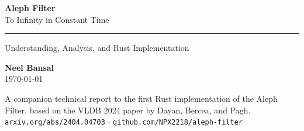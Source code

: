 \documentclass[11pt, a4paper]{report}
\theoremstyle{definition}
\begin{document}
\begin{titlepage}
  \centering
  \vspace*{3cm}
  
  {\fontsize{36}{40}\selectfont\bfseries Aleph Filter}\\[0.6cm]
  {\Large\color{DarkGray} To Infinity in Constant Time}
  
  \vspace{0.8cm}
  \rule{0.4\textwidth}{0.8pt}
  \vspace{0.8cm}
  
  {\large Understanding, Analysis, and Rust Implementation}
  
  \vspace{2.5cm}
  
  {\Large\bfseries Neel Bansal}\\[0.4cm]
  {\color{black} \today}
  
  \vfill
  
  \begin{tcolorbox}[
    colback=white,
    colframe=black!30,
    width=0.8\textwidth,
    arc=2pt,
    boxrule=0.4pt,
    top=10pt, bottom=10pt,
  ]
    \centering\small\color{DarkGray}
    A companion technical report to the first Rust implementation of the 
    Aleph Filter, based on the VLDB 2024 paper by Dayan, Bercea, and 
    Pagh.\\[6pt]
    \texttt{arxiv.org/abs/2404.04703}
    \quad$\cdot$\quad
    \texttt{github.com/NPX2218/aleph-filter}
  \end{tcolorbox}
  \vspace{1cm}
  
\end{titlepage}

\tableofcontents
\newpage
{}








\end{document}
